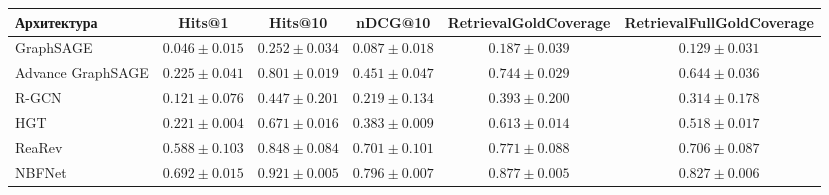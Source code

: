 \begin{tabular}{lccccc}
\toprule
Архитектура & Hits@1 & Hits@10 & nDCG@10 & RetrievalGoldCoverage & RetrievalFullGoldCoverage \\
\midrule
GraphSAGE & $0.046 \pm 0.015$ & $0.252 \pm 0.034$ & $0.087 \pm 0.018$ & $0.187 \pm 0.039$ & $0.129 \pm 0.031$ \\
Advance GraphSAGE & $0.225 \pm 0.041$ & $0.801 \pm 0.019$ & $0.451 \pm 0.047$ & $0.744 \pm 0.029$ & $0.644 \pm 0.036$ \\
R-GCN & $0.121 \pm 0.076$ & $0.447 \pm 0.201$ & $0.219 \pm 0.134$ & $0.393 \pm 0.200$ & $0.314 \pm 0.178$ \\
HGT & $0.221 \pm 0.004$ & $0.671 \pm 0.016$ & $0.383 \pm 0.009$ & $0.613 \pm 0.014$ & $0.518 \pm 0.017$ \\
ReaRev & $0.588 \pm 0.103$ & $0.848 \pm 0.084$ & $0.701 \pm 0.101$ & $0.771 \pm 0.088$ & $0.706 \pm 0.087$ \\
NBFNet & \textbf{$0.692 \pm 0.015$} & \textbf{$0.921 \pm 0.005$} & \textbf{$0.796 \pm 0.007$} & \textbf{$0.877 \pm 0.005$} & \textbf{$0.827 \pm 0.006$} \\
\bottomrule
\end{tabular}

